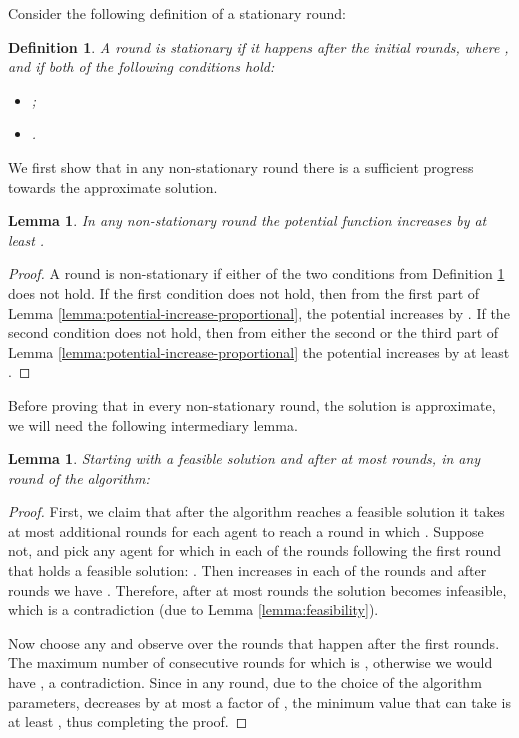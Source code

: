 \documentclass[11pt]{article}
\newtheorem{lemma}[theorem]{Lemma}
\newtheorem{definition}[theorem]{Definition}
\begin{document}
Consider the following definition of a stationary round:

\begin{definition}\label{def:alpha=1-stat-round}
A round is stationary if it happens after the initial  rounds, where ,  and if both of the following conditions hold:
\begin{itemize}
\item ;
\item .
\end{itemize}
\end{definition}

We first show that in any non-stationary round there is a sufficient progress towards the approximate solution.
\begin{lemma}\label{lemma:non-stat-round-alpha=1}
In any non-stationary round the potential function increases by at least .
\end{lemma}
\begin{proof}
A round is non-stationary if either of the two conditions from Definition \ref{def:alpha=1-stat-round} does not hold. If the first condition does not hold, then from the first part of Lemma \ref{lemma:potential-increase-proportional}, the potential increases by . If the second condition does not hold, then from either the second or the third part of Lemma \ref{lemma:potential-increase-proportional} the potential increases by at least .
\end{proof}

Before proving that in every non-stationary round, the solution is approximate, we will need the following intermediary lemma.
\begin{lemma}\label{lemma:cond-lower-bound}
Starting with a feasible solution and after at most  rounds, in any round of the algorithm:

\end{lemma}
\begin{proof}
First, we claim that after the algorithm reaches a feasible solution it takes at most  additional rounds for each agent  to reach a round in which . Suppose not, and pick any agent  for which in each of the  rounds following the first round that holds a feasible solution: . Then  increases in each of the rounds and after  rounds we have . Therefore, after at most  rounds the solution becomes infeasible, which is a contradiction (due to Lemma \ref{lemma:feasibility}).

Now choose any  and observe  over the rounds that happen after the first  rounds. The maximum number of consecutive rounds for which  is , otherwise we would have , a contradiction. Since in any round, due to the choice of the algorithm parameters,  decreases by at most a factor of , the minimum value that  can take is at least , thus completing the proof.
\end{proof}
\end{document}
